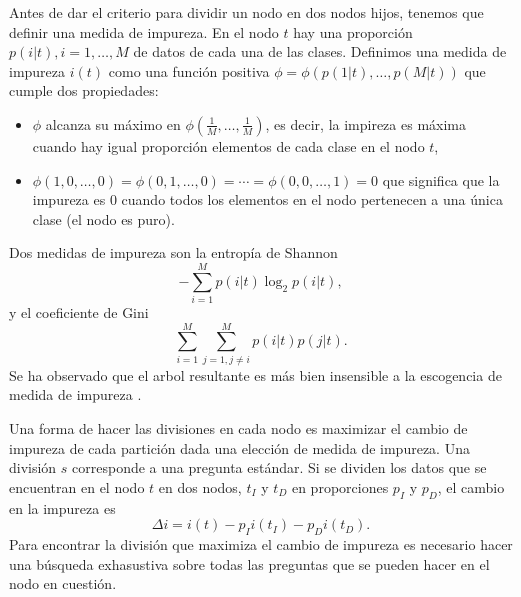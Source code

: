 \documentclass[letterpaper,12pt]{book}
\begin{document}
Antes de dar el criterio para dividir un nodo en dos nodos hijos, tenemos que definir una medida de impureza. En el nodo $t$ hay una proporción $p(i|t), i=1,\dots,M$ de datos de cada una de las clases. Definimos una medida de impureza $i(t)$ como una función positiva $\phi = \phi(p(1|t),\dots,p(M|t))$ que cumple dos propiedades:
\begin{itemize}
\item $\phi$ alcanza su máximo en  $\phi(\frac{1}{M},\dots,\frac{1}{M}) $, es decir, la impireza es máxima cuando hay igual proporción elementos de cada clase en el nodo $t$, 
\item $\phi(1,0,\dots,0) = \phi(0,1,\dots,0) = \cdots =\phi(0,0,\dots,1) = 0$ que significa que la impureza es $0$ cuando todos los elementos en el nodo pertenecen a una única clase (el nodo es puro).
\end{itemize}
Dos medidas de impureza son la entropía de Shannon
\begin{equation}
-\sum_{i=1}^{M}p(i|t)\log_2p(i|t),
\end{equation}
y el coeficiente de Gini
\begin{equation}
\sum_{i=1}^{M}\sum_{j=1, j\neq i}^{M}p(i|t)p(j|t).
\end{equation}
Se ha observado que el arbol resultante es más bien insensible a la escogencia de medida de impureza \cite{breiman_classification_1984}.

Una forma de hacer las divisiones en cada nodo es maximizar el cambio de impureza de cada partición dada una elección de medida de impureza. Una división $s$ corresponde a una pregunta estándar. Si se dividen los datos que se encuentran en el nodo $t$ en dos nodos,  $t_I$ y $t_D$ en proporciones $p_I$ y $p_D$, el cambio en la impureza es
\begin{equation}
\Delta i = i(t)-p_Ii(t_I)-p_Di(t_D).
\end{equation}
Para encontrar la división que maximiza el cambio de impureza es necesario hacer una búsqueda exhasustiva sobre todas las preguntas que se pueden hacer en el nodo en cuestión. 
\end{document}
